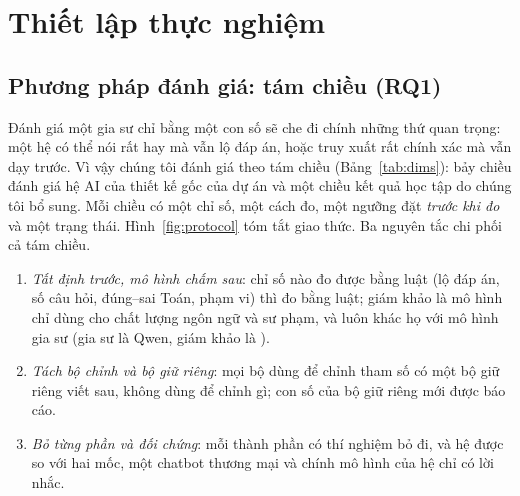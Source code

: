\section{Thiết lập thực nghiệm}\label{sec:setup}

\subsection{Phương pháp đánh giá: tám chiều (RQ1)}
Đánh giá một gia sư chỉ bằng một con số sẽ che đi chính những thứ quan trọng: một hệ có thể nói rất hay mà vẫn lộ đáp án, hoặc truy xuất rất chính xác mà vẫn dạy trước. Vì vậy chúng tôi đánh giá theo tám chiều (Bảng~\ref{tab:dims}): bảy chiều đánh giá hệ AI của thiết kế gốc của dự án và một chiều kết quả học tập do chúng tôi bổ sung. Mỗi chiều có một chỉ số, một cách đo, một ngưỡng đặt \emph{trước khi đo} và một trạng thái. Hình~\ref{fig:protocol} tóm tắt giao thức. Ba nguyên tắc chi phối cả tám chiều.
\begin{enumerate}
  \item \emph{Tất định trước, mô hình chấm sau}: chỉ số nào đo được bằng luật (lộ đáp án, số câu hỏi, đúng--sai Toán, phạm vi) thì đo bằng luật; giám khảo là mô hình chỉ dùng cho chất lượng ngôn ngữ và sư phạm, và luôn khác họ với mô hình gia sư (gia sư là Qwen, giám khảo là ).
  \item \emph{Tách bộ chỉnh và bộ giữ riêng}: mọi bộ dùng để chỉnh tham số có một bộ giữ riêng viết sau, không dùng để chỉnh gì; con số của bộ giữ riêng mới được báo cáo.
  \item \emph{Bỏ từng phần và đối chứng}: mỗi thành phần có thí nghiệm bỏ đi, và hệ được so với hai mốc, một chatbot thương mại và chính mô hình của hệ chỉ có lời nhắc.
\end{enumerate}

